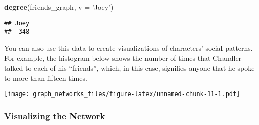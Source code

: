 \documentclass[]{article}
\newenvironment{Shaded}{\begin{snugshade}}{\end{snugshade}}
\newcommand{\KeywordTok}[1]{\textcolor[rgb]{0.13,0.29,0.53}{\textbf{#1}}}
\newcommand{\DataTypeTok}[1]{\textcolor[rgb]{0.13,0.29,0.53}{#1}}
\newcommand{\DecValTok}[1]{\textcolor[rgb]{0.00,0.00,0.81}{#1}}
\newcommand{\StringTok}[1]{\textcolor[rgb]{0.31,0.60,0.02}{#1}}
\newcommand{\OperatorTok}[1]{\textcolor[rgb]{0.81,0.36,0.00}{\textbf{#1}}}
\newcommand{\NormalTok}[1]{#1}
\begin{document}
\begin{Shaded}
\begin{Highlighting}[]
\KeywordTok{degree}\NormalTok{(friends_graph, }\DataTypeTok{v =} \StringTok{'Joey'}\NormalTok{)}
\end{Highlighting}
\end{Shaded}

\begin{verbatim}
## Joey 
##  348
\end{verbatim}

You can also use this data to create visualizations of characters'
social patterns. For example, the histogram below shows the number of
times that Chandler talked to each of his ``friends'', which, in this
case, signifies anyone that he spoke to more than fifteen times.

\begin{Shaded}
\end{Shaded}

\texttt{[image: graph\_networks\_files/figure-latex/unnamed-chunk-11-1.pdf]}

\subsubsection{Visualizing the Network}\label{visualizing-the-network}
\end{document}
